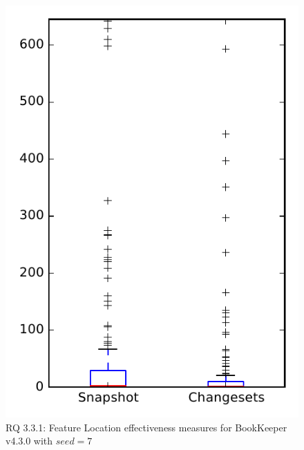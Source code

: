 
\begin{figure}
\centering
\includegraphics[height=0.4\textheight]{figures/flt_seed/rq1_bookkeeper_7}
\caption{RQ 3.3.1: Feature Location effectiveness measures for BookKeeper v4.3.0 with $seed=7$}
\label{fig:flt_seed:rq1:bookkeeper}
\end{figure}
